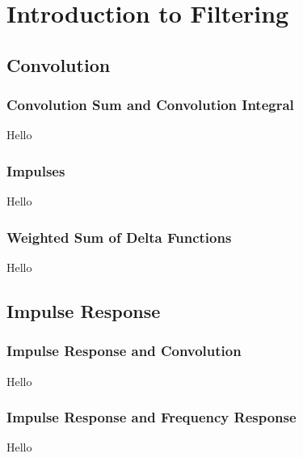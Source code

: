 \chapter{Introduction to Filtering}

\section{Convolution}
\subsection{Convolution Sum and Convolution Integral}
Hello

\subsection{Impulses}
Hello

\subsection{Weighted Sum of Delta Functions}
Hello

\section{Impulse Response}
\subsection{Impulse Response and Convolution}
Hello

\subsection{Impulse Response and Frequency Response}
Hello
